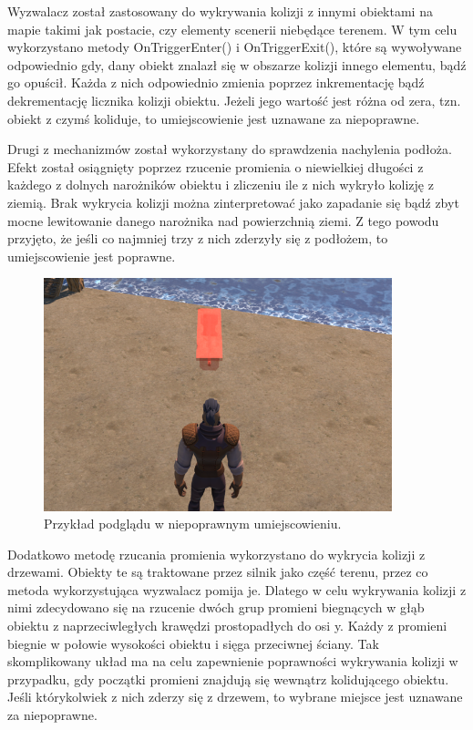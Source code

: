 Wyzwalacz został zastosowany do wykrywania kolizji z innymi obiektami na mapie takimi jak postacie, czy elementy
scenerii niebędące terenem. W tym celu wykorzystano metody OnTriggerEnter() i OnTriggerExit(), które są wywoływane
odpowiednio gdy, dany obiekt znalazł się w obszarze kolizji innego elementu, bądź go opuścił. Każda z nich odpowiednio
zmienia poprzez inkrementację bądź dekrementację licznika kolizji obiektu. Jeżeli jego wartość jest różna od zera, tzn.
obiekt z czymś koliduje, to umiejscowienie jest uznawane za niepoprawne.

Drugi z mechanizmów został wykorzystany do sprawdzenia nachylenia podłoża. Efekt został osiągnięty poprzez rzucenie
promienia o niewielkiej długości z każdego z dolnych narożników obiektu i zliczeniu ile z nich wykryło kolizję z ziemią.
Brak wykrycia kolizji można zinterpretować jako zapadanie się bądź zbyt mocne lewitowanie danego narożnika nad
powierzchnią ziemi. Z tego powodu przyjęto, że jeśli co najmniej trzy z nich zderzyły się z podłożem, to umiejscowienie
jest poprawne.

\begin{figure}[h!]
    \centering
    \includegraphics[width=0.9\textwidth]{images/implementacja/mechanizm_budowania/niepoprawne.png}
    \caption{Przykład podglądu w niepoprawnym umiejscowieniu.}
\end{figure}

Dodatkowo metodę rzucania promienia wykorzystano do wykrycia kolizji z drzewami. Obiekty te są traktowane przez silnik
jako część terenu, przez co metoda wykorzystująca wyzwalacz pomija je. Dlatego w celu wykrywania kolizji z nimi
zdecydowano się na rzucenie dwóch grup promieni biegnących w głąb obiektu z naprzeciwległych krawędzi prostopadłych do
osi y. Każdy z promieni biegnie w połowie wysokości obiektu i sięga przeciwnej ściany. Tak skomplikowany układ ma na
celu zapewnienie poprawności wykrywania kolizji w przypadku, gdy początki promieni znajdują się wewnątrz kolidującego
obiektu. Jeśli którykolwiek z nich zderzy się z drzewem, to wybrane miejsce jest uznawane za niepoprawne.

